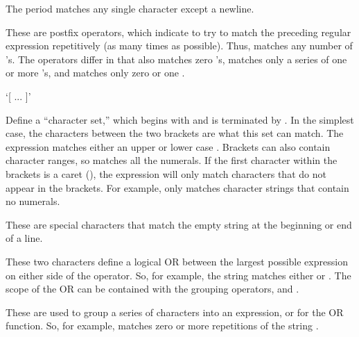 \begin{description}

\item{}

The period matches any single character except a newline.  

\item{\lit{*} \lit{+} }
  
  These are postfix operators, which indicate to try to match the
  preceding regular expression repetitively (as many times as
  possible). Thus,  matches any number of 's. The
  operators differ in that  also matches zero 's,
   matches only a series of one or more 's, and
    matches only zero or one .

\item{`[ ... ]'}
  
  Define a ``character set,'' which begins with \lit{[} and is
  terminated by \lit{]}.  In the simplest case, the characters between
  the two brackets are what this set can match. The expression
  \lit{[Ss]} matches either an upper or lower case . Brackets
  can also contain character ranges, so \lit{[0-9]} matches all the
  numerals. If the first character within the brackets is a caret
  (\lit{\^{ }}), the expression will only match characters that do not
  appear in the brackets. For example, \lit{[\^{ }0-9]*} only matches
  character strings that contain no numerals.

\item{\lit{\^{ }} \lit{\$}}
  
  These are special characters that match the empty string at the
  beginning or end of a line.

\item{\lit{$\backslash|$}}
  
  These two characters define a logical OR between the largest
  possible expression on either side of the operator.  So, for
  example, the string  matches
  either  or . The scope of the OR can be
  contained with the grouping operators, \lit{$\backslash$(} and
  \lit{$\backslash$)}.


\item{\lit{$\backslash$(} \lit{$\backslash$)}}
  
  These are used to group a series of characters into an expression,
  or for the OR function. So, for example,
   matches zero or more
  repetitions of the string .

\end{description}


